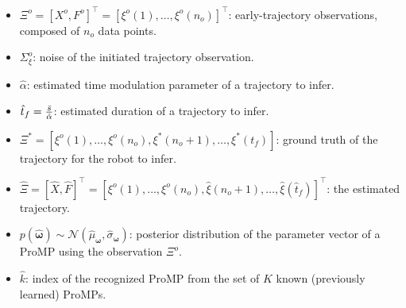 \documentclass[utf8]{frontiersSCNS} %
\newcommand{\todo}[1]{\textcolor{red}{\textbf{/*#1*/}}}
\begin{document}
\begin{itemize}
\item $\Xi^o =[X^o, F^o]^\top = [\xi^o(1),\ldots, \xi^o(n_o)]^\top$: early-trajectory observations, composed of $n_o$ data points.
\item $\Sigma_\xi^o$: noise of the initiated trajectory observation.
\item $\hat{\alpha}$: estimated time modulation parameter of a trajectory to infer.
\item $\hat{t}_f ={\bar{s} \over \hat{\alpha}}$: estimated duration of a trajectory to infer.
\item $\Xi^* = [\xi^o(1),\ldots, \xi^o(n_o), \xi^*(n_o+1),\ldots, \xi^*(t_f)]$: ground truth of the trajectory for the robot to infer.
\item $\hat{\Xi} =[\hat{X}, \hat{F}]^\top = [\xi^o(1),\ldots, \xi^o(n_o), \hat{\xi}(n_o + 1),\ldots,\hat{\xi}(\hat{t}_f)]^\top$: the estimated trajectory.
\item $p(\hat{\boldsymbol{\omega}}) \sim \mathcal{N}(\hat{\mu}_{\boldsymbol{\omega}}, \hat{\sigma}_{\boldsymbol{\omega}})$: posterior distribution of the parameter vector of a ProMP using the observation $\Xi^o$.


\item $\hat{k}$: index of the recognized ProMP from the set of $K$ known (previously learned) ProMPs.
\end{itemize}
\end{document}
